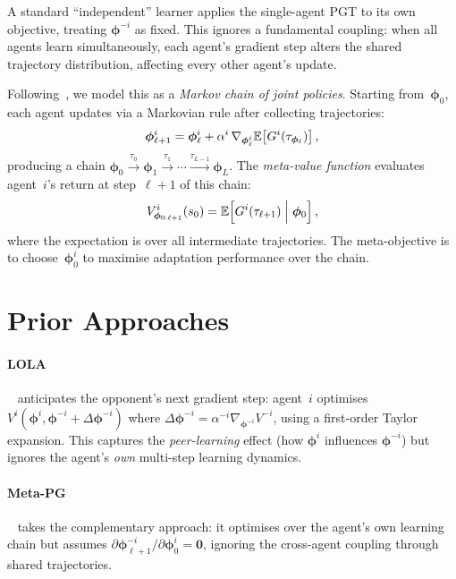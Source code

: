 A standard ``independent'' learner applies the single-agent PGT to its own objective, treating $\bm{\phi}^{-i}$ as fixed. This ignores a fundamental coupling: when all agents learn simultaneously, each agent's gradient step alters the shared trajectory distribution, affecting every other agent's update.

Following~\cite{kim2021policygradientalgorithmlearning}, we model this as a \emph{Markov chain of joint policies}. Starting from~$\bm{\phi}_0$, each agent updates via a Markovian rule after collecting trajectories:
\begin{equation}\label{eq:inner-loop}
  \bm{\phi}_{\ell+1}^i = \bm{\phi}_\ell^i + \alpha^i\,\nabla_{\bm{\phi}_\ell^i}\mathbb{E}\!\left[G^i(\tau_{\bm{\phi}_\ell})\right],
\end{equation}
producing a chain $\bm{\phi}_0\xrightarrow{\tau_0}\bm{\phi}_1\xrightarrow{\tau_1}\cdots\xrightarrow{\tau_{L-1}}\bm{\phi}_L$. The \emph{meta-value function} evaluates agent~$i$'s return at step~$\ell+1$ of this chain:
\begin{equation}\label{eq:meta-value}
  V^i_{\bm{\phi}_{0:\ell+1}}(s_0) = \mathbb{E}\!\left[G^i(\tau_{\ell+1})\;\Big|\;\bm{\phi}_0\right],
\end{equation}
where the expectation is over all intermediate trajectories. The meta-objective is to choose~$\bm{\phi}_0^i$ to maximise adaptation performance over the chain.

\section{Prior Approaches}
\label{sec:prior-approaches}

\paragraph{LOLA}~\cite{foerster2018lola} anticipates the opponent's next gradient step: agent~$i$ optimises $V^i(\bm{\phi}^i,\bm{\phi}^{-i}+\Delta\bm{\phi}^{-i})$ where $\Delta\bm{\phi}^{-i}=\alpha^{-i}\nabla_{\bm{\phi}^{-i}}V^{-i}$, using a first-order Taylor expansion. This captures the \emph{peer-learning} effect (how $\bm{\phi}^i$ influences $\bm{\phi}^{-i}$) but ignores the agent's \emph{own} multi-step learning dynamics.

\paragraph{Meta-PG}~\cite{alshedivat2018} takes the complementary approach: it optimises over the agent's own learning chain but assumes $\partial\bm{\phi}_{\ell+1}^{-i}/\partial\bm{\phi}_0^i=\bm{0}$, ignoring the cross-agent coupling through shared trajectories.

